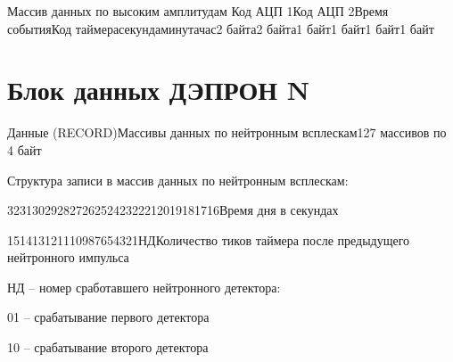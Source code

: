 {\footnotesize Массив данных по высоким амплитудам Код АЦП 1Код АЦП 2Время событияКод таймерасекундаминутачас2 байта2 байта1 байт1 байт1 байт1 байт}


\begin{flushleft}
	
\end{flushleft}


\begin{flushleft}
	\newpage
	
\end{flushleft}


\section{Блок данных ДЭПРОН N}

\begin{flushleft}
	
\end{flushleft}


{\footnotesize Данные (RECORD)Массивы данных по нейтронным всплескам127 массивов  по 4 байт}


\begin{flushleft}
	Структура записи в массив данных по нейтронным всплескам:
\end{flushleft}


3231302928272625242322212019181716{\small Время дня в секундах}


\begin{flushleft}
	
\end{flushleft}


151413121110987654321{\small НДКоличество тиков таймера после предыдущего нейтронного импульса}


\begin{flushleft}
	
\end{flushleft}


\begin{flushleft}
	НД -- номер сработавшего нейтронного детектора:
\end{flushleft}


\begin{flushleft}
	01 -- срабатывание первого детектора
\end{flushleft}


\begin{flushleft}
	10 -- срабатывание второго детектора
\end{flushleft}


